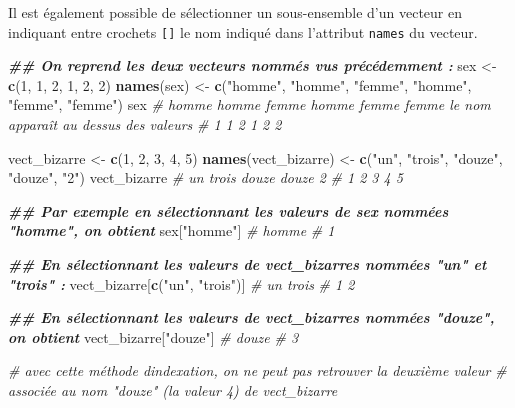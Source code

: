 \documentclass[
]{book}
\newenvironment{Shaded}{\begin{snugshade}}{\end{snugshade}}
\newcommand{\CommentTok}[1]{\textcolor[rgb]{0.56,0.35,0.01}{\textit{#1}}}
\newcommand{\DecValTok}[1]{\textcolor[rgb]{0.00,0.00,0.81}{#1}}
\newcommand{\DocumentationTok}[1]{\textcolor[rgb]{0.56,0.35,0.01}{\textbf{\textit{#1}}}}
\newcommand{\FunctionTok}[1]{\textcolor[rgb]{0.13,0.29,0.53}{\textbf{#1}}}
\newcommand{\NormalTok}[1]{#1}
\newcommand{\OtherTok}[1]{\textcolor[rgb]{0.56,0.35,0.01}{#1}}
\newcommand{\StringTok}[1]{\textcolor[rgb]{0.31,0.60,0.02}{#1}}
\begin{document}
Il est également possible de sélectionner un sous-ensemble d'un vecteur en indiquant entre crochets \texttt{{[}{]}} le nom indiqué dans l'attribut \texttt{names} du vecteur.

\begin{Shaded}
\begin{Highlighting}[]
\DocumentationTok{\#\# On reprend les deux vecteurs nommés vus précédemment :}
\NormalTok{sex }\OtherTok{\textless{}{-}} \FunctionTok{c}\NormalTok{(}\DecValTok{1}\NormalTok{, }\DecValTok{1}\NormalTok{, }\DecValTok{2}\NormalTok{, }\DecValTok{1}\NormalTok{, }\DecValTok{2}\NormalTok{, }\DecValTok{2}\NormalTok{)}
\FunctionTok{names}\NormalTok{(sex) }\OtherTok{\textless{}{-}} \FunctionTok{c}\NormalTok{(}\StringTok{"homme"}\NormalTok{, }\StringTok{"homme"}\NormalTok{, }\StringTok{"femme"}\NormalTok{, }\StringTok{"homme"}\NormalTok{, }\StringTok{"femme"}\NormalTok{, }\StringTok{"femme"}\NormalTok{)}
\NormalTok{sex}
\CommentTok{\# homme homme femme homme femme femme     le nom apparaît au dessus des valeurs}
\CommentTok{\#     1     1     2     1     2     2}

\NormalTok{vect\_bizarre }\OtherTok{\textless{}{-}} \FunctionTok{c}\NormalTok{(}\DecValTok{1}\NormalTok{, }\DecValTok{2}\NormalTok{, }\DecValTok{3}\NormalTok{, }\DecValTok{4}\NormalTok{, }\DecValTok{5}\NormalTok{)}
\FunctionTok{names}\NormalTok{(vect\_bizarre) }\OtherTok{\textless{}{-}} \FunctionTok{c}\NormalTok{(}\StringTok{"un"}\NormalTok{, }\StringTok{"trois"}\NormalTok{, }\StringTok{"douze"}\NormalTok{, }\StringTok{"douze"}\NormalTok{, }\StringTok{"2"}\NormalTok{)}
\NormalTok{vect\_bizarre}
\CommentTok{\# un trois douze douze     2 }
\CommentTok{\#  1     2     3     4     5}

\DocumentationTok{\#\# Par exemple en sélectionnant les valeurs de sex nommées "homme", on obtient}
\NormalTok{sex[}\StringTok{"homme"}\NormalTok{]}
\CommentTok{\# homme }
\CommentTok{\#     1}

\DocumentationTok{\#\# En sélectionnant les valeurs de vect\_bizarres nommées "un" et "trois" :}
\NormalTok{vect\_bizarre[}\FunctionTok{c}\NormalTok{(}\StringTok{"un"}\NormalTok{, }\StringTok{"trois"}\NormalTok{)]}
\CommentTok{\# un trois }
\CommentTok{\#  1     2}

\DocumentationTok{\#\# En sélectionnant les valeurs de vect\_bizarres nommées "douze", on obtient}
\NormalTok{vect\_bizarre[}\StringTok{"douze"}\NormalTok{]}
\CommentTok{\# douze }
\CommentTok{\#     3}

\CommentTok{\# avec cette méthode d\textquotesingle{}indexation, on ne peut pas retrouver la deuxième valeur}
\CommentTok{\# associée au nom "douze" (la valeur 4) de vect\_bizarre}


\end{Highlighting}
\end{Shaded}
\end{document}
